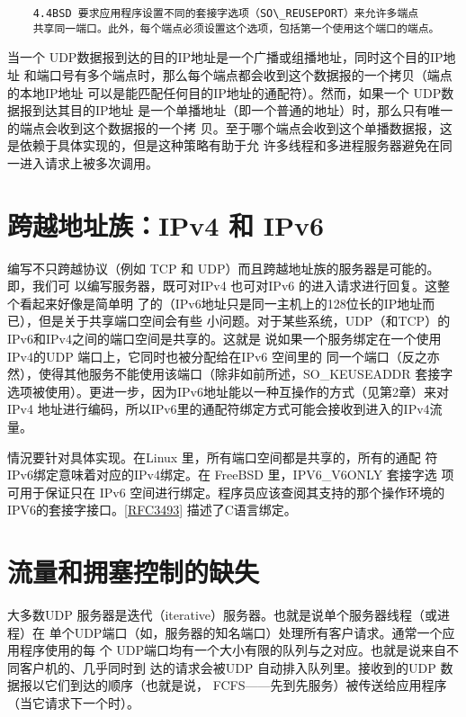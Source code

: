 \begin{verbatim}
    4.4BSD 要求应用程序设置不同的套接字选项（SO\_REUSEPORT）来允许多端点
    共享同一端口。此外，每个端点必须设置这个选项，包括第一个使用这个端口的端点。
\end{verbatim}

当一个 UDP数据报到达的目的IP地址是一个广播或组播地址，同时这个目的IP地址
和端口号有多个端点时，那么每个端点都会收到这个数据报的一个拷贝（端点的本地IP地址
可以是能匹配任何目的IP地址的通配符）。然而，如果一个 UDP数据报到达其目的IP地址
是一个单播地址（即一个普通的地址）时，那么只有唯一的端点会收到这个数据报的一个拷
贝。至于哪个端点会收到这个单播数据报，这是依赖于具体实现的，但是这种策略有助于允
许多线程和多进程服务器避免在同一进入请求上被多次调用。

\section{跨越地址族：IPv4 和 IPv6}

编写不只跨越协议（例如 TCP 和 UDP）而且跨越地址族的服务器是可能的。即，我们可
以编写服务器，既可对IPv4 也可对IPv6 的进入请求进行回复。这整个看起来好像是简单明
了的（IPv6地址只是同一主机上的128位长的IP地址而已），但是关于共享端口空间会有些
小问题。对于某些系统，UDP（和TCP）的IPv6和IPv4之间的端口空间是共享的。这就是
说如果一个服务绑定在一个使用IPv4的UDP 端口上，它同时也被分配给在IPv6 空间里的
同一个端口（反之亦然），使得其他服务不能使用该端口（除非如前所述，SO\_KEUSEADDR
套接字选项被使用）。更进一步，因为IPv6地址能以一种互操作的方式（见第2章）来对
IPv4 地址进行编码，所以IPv6里的通配符绑定方式可能会接收到进入的IPv4流量。

\begin{tcolorbox}
    情況要针对具体实现。在Linux 里，所有端口空间都是共享的，所有的通配
    符 IPv6绑定意味着对应的IPv4绑定。在 FreeBSD 里，IPV6\_V6ONLY 套接字选
    项可用于保证只在 IPv6 空间进行绑定。程序员应该查阅其支持的那个操作环境的
    IPV6的套接字接口。\href{https://www.rfc-editor.org/rfc/rfc3493}{[RFC3493]} 描述了C语言绑定。
\end{tcolorbox}

\section{流量和拥塞控制的缺失}

大多数UDP 服务器是迭代（iterative）服务器。也就是说单个服务器线程（或进程）在
单个UDP端口（如，服务器的知名端口）处理所有客户请求。通常一个应用程序使用的每
个 UDP端口均有一个大小有限的队列与之对应。也就是说来自不同客户机的、几乎同时到
达的请求会被UDP 自动排入队列里。接收到的UDP 数据报以它们到达的顺序（也就是说，
FCFS——先到先服务）被传送给应用程序（当它请求下一个时）。

